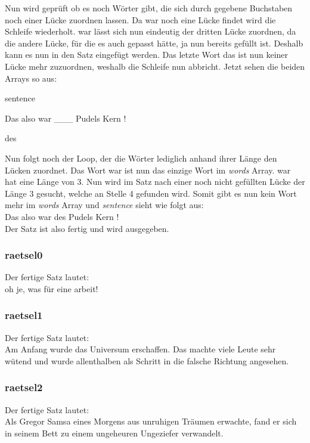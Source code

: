 \documentclass[a4paper, 12pt]{scrartcl}
\begin{document}
Nun  wird  geprüft  ob  es  noch  Wörter  gibt,  die  sich  durch  gegebene  Buchstaben  noch  einer  Lücke zuordnen lassen. Da {\glqq}war{\grqq} noch eine Lücke findet wird die Schleife wiederholt. {\glqq}war{\grqq} lässt sich nun eindeutig der dritten Lücke zuordnen, da die andere Lücke, für die es auch gepasst hätte, ja nun bereits gefüllt  ist. Deshalb kann es nun in den Satz eingefügt werden. Das letzte Wort {\glqq}das{\grqq} ist nun keiner Lücke mehr zuzuordnen, weshalb die Schleife nun abbricht. Jetzt sehen die beiden Arrays so aus:

\begin{labeling}{sentence}
    \item [sentence] Das also war {\_}{\_}{\_} Pudels Kern !
    \item [words] des
\end{labeling}

Nun folgt noch der Loop, der die Wörter lediglich anhand ihrer Länge den Lücken zuordnet. Das Wort {\glqq}war{\grqq} ist nun das einzige Wort im \emph{words} Array. {\glqq}war{\grqq} hat eine Länge von 3. Nun wird im Satz nach einer noch nicht gefüllten Lücke der Länge 3 gesucht, welche an Stelle 4 gefunden wird. Somit gibt es nun kein Wort mehr im \emph{words} Array und \emph{sentence} sieht wie folgt aus:\\
Das also war des Pudels Kern !\\
Der Satz ist also fertig und wird ausgegeben.

\subsubsection{raetsel0}
Der fertige Satz lautet:\\
oh je, was für eine arbeit!

\subsubsection{raetsel1}
Der fertige Satz lautet:\\
Am Anfang wurde das Universum erschaffen. Das machte viele Leute sehr wütend und wurde allenthalben als Schritt in die falsche Richtung angesehen.

\subsubsection{raetsel2}
Der fertige Satz lautet:\\
Als Gregor Samsa eines Morgens aus unruhigen Träumen erwachte, fand er sich in seinem Bett zu einem ungeheuren Ungeziefer verwandelt.
\end{document}
